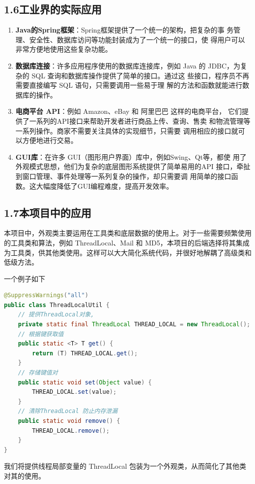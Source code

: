 \documentclass[24pt,a4paper]{article}%
\begin{document}
\subsection*{\songti 1.6工业界的实际应用}
\begin{enumerate}
    \item \textbf{Java的Spring框架}：Spring框架提供了一个统一的架构，把复杂的事
务管理、安全性、数据库访问等功能封装成为了一个统一的接口，使
得用户可以非常方便地使用这些复杂功能。
    \item \textbf{数据库连接}：许多应用程序使用的数据库连接库，例如 Java 的
JDBC，为复杂的 SQL 查询和数据库操作提供了简单的接口。通过这
些接口，程序员不再需要直接编写 SQL 语句，只需要调用一些易于理
解的方法和函数就能进行数据库的操作。
    \item \textbf{电商平台 API}：例如 Amazon、eBay 和 阿里巴巴 这样的电商平台，
它们提供了一系列的API接口来帮助开发者进行商品上传、查询、售卖
和物流管理等一系列操作。商家不需要关注具体的实现细节，只需要
调用相应的接口就可以方便地进行交易。
    \item \textbf{GUI库}：在许多 GUI（图形用户界面）库中，例如Swing、Qt等，都使
用了外观模式思想，他们为复杂的底层图形系统提供了简单易用的API
接口，牵扯到窗口管理、事件处理等一系列复杂的操作，却只需要调
用简单的接口函数。这大幅度降低了GUI编程难度，提高开发效率。
\end{enumerate}

\subsection*{\songti 1.7本项目中的应用}
本项目中，外观类主要运用在工具类和底层数据的使用上。对于一些需要频繁使用的工具类和算法，例如 ThreadLocal、Mail 和 MD5，本项目的后端选择将其集成为工具类，供其他类使用。这样可以大大简化系统代码，并很好地解耦了高级类和低级方法。

一个例子如下
\begin{lstlisting}[language=Java]
@SuppressWarnings("all")
public class ThreadLocalUtil {
    // 提供ThreadLocal对象,
    private static final ThreadLocal THREAD_LOCAL = new ThreadLocal();
    // 根据键获取值
    public static <T> T get() {
        return (T) THREAD_LOCAL.get();
    }
    // 存储键值对
    public static void set(Object value) {
        THREAD_LOCAL.set(value);
    }
    // 清除ThreadLocal 防止内存泄漏
    public static void remove() {
        THREAD_LOCAL.remove();
    }
}
\end{lstlisting}
我们将提供线程局部变量的 ThreadLocal 包装为一个外观类，从而简化了其他类对其的使用。
\end{document}

